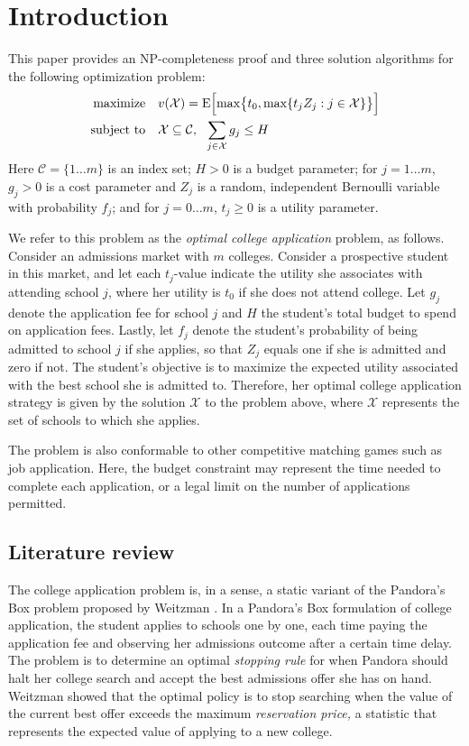 \section{Introduction}

This paper provides an NP-completeness proof and three solution algorithms for the following optimization problem:
\begin{align} \label{headlineproblem}
\begin{split}
\text{maximize}\quad &  v(\mathcal{X}) =
 \operatorname{E}\Bigl[\max\bigr\{t_0,
\max\{t_j Z_j : j \in \mathcal{X}\}\bigr\}\Bigr] \\
\text{subject to}\quad & \mathcal{X} \subseteq \mathcal{C}, ~~\sum_{j\in \mathcal{X}} g_j \leq H
\end{split}
\end{align}
Here $\mathcal{C} = \{ 1 \dots m\}$ is an index set; $H > 0$ is a budget parameter; for $j = 1 \dots m$, $g_j > 0$ is a cost parameter and $Z_j$ is a random, independent Bernoulli variable with probability $f_j$; and for $j = 0\dots m$, $t_j\geq 0$ is a utility parameter.

We refer to this problem as the \emph{optimal college application} problem, as follows. Consider an admissions market with $m$ colleges. Consider a prospective student in this market, and let each $t_j$-value indicate the utility she associates with attending school $j$, where her utility is $t_0$ if she does not attend college. Let $g_j$ denote the application fee for school $j$ and $H$ the student's total budget to spend on application fees. Lastly, let $f_j$ denote the student's probability of being admitted to school $j$ if she applies, so that $Z_j$ equals one if she is admitted and zero if not. The student's objective is to maximize the expected utility associated with the best school she is admitted to. Therefore, her optimal college application strategy is given by the solution $\mathcal{X}$ to the problem above, where $\mathcal{X}$ represents the set of schools to which she applies. 

The problem is also conformable to other competitive matching games such as job application. Here, the budget constraint may represent the time needed to complete each application, or a legal limit on the number of applications permitted.

\subsection{Literature review}
The college application problem is, in a sense, a static variant of the Pandora's Box problem proposed by Weitzman \cite{weitzman1979}. In a Pandora's Box formulation of college application, the student applies to schools one by one, each time paying the application fee and observing her admissions outcome after a certain time delay. The problem is to determine an optimal \emph{stopping rule} for when Pandora should halt her college search and accept the best admissions offer she has on hand. Weitzman showed that the optimal policy is to stop searching when the value of the current best offer exceeds the maximum \emph{reservation price,} a statistic that represents the expected value of applying to a new college.

